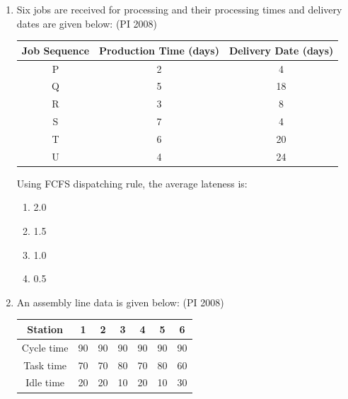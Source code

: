 \documentclass[journal,12pt,onecolumn]{IEEEtran}
\theoremstyle{remark}
\begin{document}
\begin{enumerate}
\begin{multicols}{4}
    \begin{enumerate}
\item  0.2592
\item  0.2916
\item  0.3240 
\item  0.4860
 \end{enumerate}
\end{multicols}
\vspace{1cm}
\vspace{0.5cm}
\item %
Six jobs are received for processing and their processing times and delivery dates are given below:
\hfill{(PI 2008)}
\begin{center}
\begin{tabular}{|c|c|c|}
\hline
\textbf{Job Sequence} & \textbf{Production Time (days)} & \textbf{Delivery Date (days)} \\
\hline
P & 2 & 4 \\
Q & 5 & 18 \\
R & 3 & 8 \\
S & 7 & 4 \\
T & 6 & 20 \\
U & 4 & 24 \\
\hline
\end{tabular}
\end{center}

Using FCFS dispatching rule, the average lateness is:  

\begin{multicols}{4}
    \begin{enumerate}
\item 2.0 
\item1.5 
\item1.0 
\item0.5
 \end{enumerate}
\end{multicols}
\vspace{1cm}
\vspace{0.5cm}
\item %
An assembly line data is given below:
\hfill{(PI 2008)}
\begin{center}
\begin{tabular}{|c|c|c|c|c|c|c|}
\hline
\textbf{Station} & 1 & 2 & 3 & 4 & 5 & 6 \\
\hline
Cycle time & 90 & 90 & 90 & 90 & 90 & 90 \\
Task time  & 70 & 70 & 80 & 70 & 80 & 60 \\
Idle time  & 20 & 20 & 10 & 20 & 10 & 30 \\
\hline
\end{tabular}
\end{center}


\end{enumerate}
\end{document}
